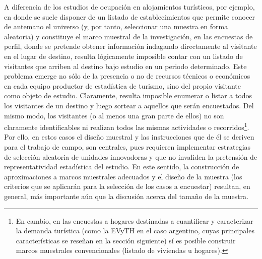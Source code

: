 \documentclass[
]{book}
\begin{document}
A diferencia de los estudios de ocupación en alojamientos turísticos, por ejemplo, en donde se suele disponer de un listado de establecimientos que permite conocer de antemano el universo (y, por tanto, seleccionar una muestra en forma aleatoria) y constituye el marco muestral de la investigación, en las encuestas de perfil, donde se pretende obtener información indagando directamente al visitante en el lugar de destino, resulta lógicamente imposible contar con un listado de visitantes que arriben al destino bajo estudio en un periodo determinado. Este problema emerge no sólo de la presencia o no de recursos técnicos o económicos en cada equipo productor de estadística de turismo, sino del propio visitante como objeto de estudio. Claramente, resulta imposible enumerar o listar a todos los visitantes de un destino y luego sortear a aquellos que serán encuestados. Del mismo modo, los visitantes (o al menos una gran parte de ellos) no son claramente identificables ni realizan todos las mismas actividades o recorridos\footnote{En cambio, en las encuestas a hogares destinadas a cuantificar y caracterizar la demanda turística (como la EVyTH en el caso argentino, cuyas principales características se reseñan en la sección siguiente) sí es posible construir marcos muestrales convencionales (listado de viviendas u hogares).}. Por ello, en estos casos el diseño muestral y las instrucciones que de él se deriven para el trabajo de campo, son centrales, pues requieren implementar estrategias de selección aleatoria de unidades innovadoras y que no invaliden la pretensión de representatividad estadística del estudio. En este sentido, la construcción de aproximaciones a marcos muestrales adecuados y el diseño de la muestra (los criterios que se aplicarán para la selección de los casos a encuestar) resultan, en general, más importante aún que la discusión acerca del tamaño de la muestra.
\end{document}
